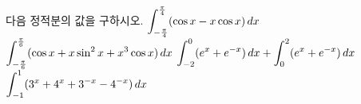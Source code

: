 다음 정적분의 값을 구하시오.
 $\displaystyle\int_{-\frac{\pi}{4}}^{\frac{\pi}{4}}(\cos x-x\cos x)\mkern3mu dx$
 $\displaystyle\int_{-\frac{\pi}{6}}^{\frac{\pi}{6}}(\cos x+x\sin^2 x+x^3\cos x)\mkern3mu dx$
 $\displaystyle\int_{-2}^{0}(e^x+e^{-x})\mkern3mu dx+\int_{0}^{2}(e^x+e^{-x})\mkern3mu dx$
 $\displaystyle\int_{-1}^{1}(3^x+4^x+3^{-x}-4^{-x})\mkern3mu dx$
